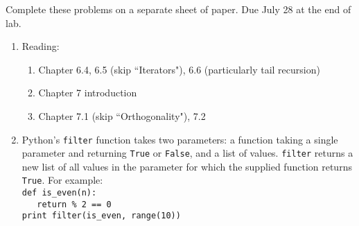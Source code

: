 \documentclass[9pt]{article}
\begin{document}
\noindent Complete these problems on a separate sheet of paper. Due July 28 at
the end of lab.
\begin{enumerate}
   \item Reading:

         \begin{enumerate}
            \item Chapter 6.4, 6.5 (skip ``Iterators"), 6.6 (particularly tail
                  recursion)
            \item Chapter 7 introduction
            \item Chapter 7.1 (skip ``Orthogonality"), 7.2
         \end{enumerate}
   \item Python's \verb|filter| function takes two parameters: a function taking
         a single parameter and returning \verb|True| or \verb|False|, and a
         list of values. \verb|filter| returns a new list of all values in the
         parameter for which the supplied function returns \verb|True|. For
         example: \\

         \verb|def is_even(n):| \\
         \verb|   return % 2 == 0| \\
         \verb|print filter(is_even, range(10))| \\


\end{enumerate}
\end{document}
